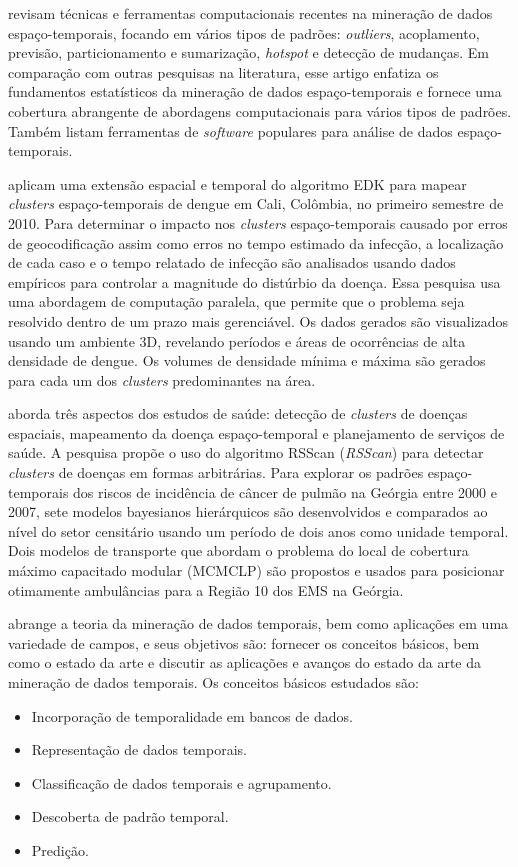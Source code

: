  revisam técnicas e ferramentas computacionais recentes na mineração de dados espaço-temporais, focando em vários tipos de padrões: \textit{outliers}, acoplamento, previsão, particionamento e sumarização, \textit{hotspot} e detecção de mudanças. Em comparação com outras pesquisas na literatura, esse artigo enfatiza os fundamentos estatísticos da mineração de dados espaço-temporais e fornece uma cobertura abrangente de abordagens computacionais para vários tipos de padrões. Também listam ferramentas de \textit{software} populares para análise de dados espaço-temporais.

 aplicam uma extensão espacial e temporal do algoritmo \acrfull{EDK} para mapear \textit{clusters} espaço-temporais de dengue em Cali, Colômbia, no primeiro semestre de 2010. Para determinar o impacto nos \textit{clusters} espaço-temporais causado por erros de geocodificação assim como erros no tempo estimado da infecção, a localização de cada caso e o tempo relatado de infecção são analisados usando dados empíricos para controlar a magnitude do distúrbio da doença. Essa pesquisa usa uma abordagem de computação paralela, que permite que o problema seja resolvido dentro de um prazo mais gerenciável. Os dados gerados são visualizados usando um ambiente 3D, revelando períodos e áreas de ocorrências de alta densidade de dengue. Os volumes de densidade mínima e máxima são gerados para cada um dos \textit{clusters} predominantes na área.

 aborda três aspectos dos estudos de saúde: detecção de \textit{clusters} de doenças espaciais, mapeamento da doença espaço-temporal e planejamento de serviços de saúde. A pesquisa propõe o uso do algoritmo \acrshort{RSScan} (\emph{\acrlong{RSScan}}) para detectar \textit{clusters} de doenças em formas arbitrárias. Para explorar os padrões espaço-temporais dos riscos de incidência de câncer de pulmão na Geórgia entre 2000 e 2007, sete modelos bayesianos hierárquicos são desenvolvidos e comparados ao nível do setor censitário usando um período de dois anos como unidade temporal. Dois modelos de transporte que abordam o problema do local de cobertura máximo capacitado modular (\acrshort{MCMCLP}) são propostos e usados para posicionar otimamente ambulâncias para a Região 10 dos \acrfull{EMS} na Geórgia.

 abrange a teoria da mineração de dados temporais, bem como aplicações em uma variedade de campos, e seus objetivos são: fornecer os conceitos básicos, bem como o estado da arte e discutir as aplicações e avanços do estado da arte da mineração de dados temporais. Os conceitos básicos estudados são:
\begin{itemize}
\item Incorporação de temporalidade em bancos de dados.
\item Representação de dados temporais.
\item Classificação de dados temporais e agrupamento.
\item Descoberta de padrão temporal.
\item Predição.
\end{itemize}

